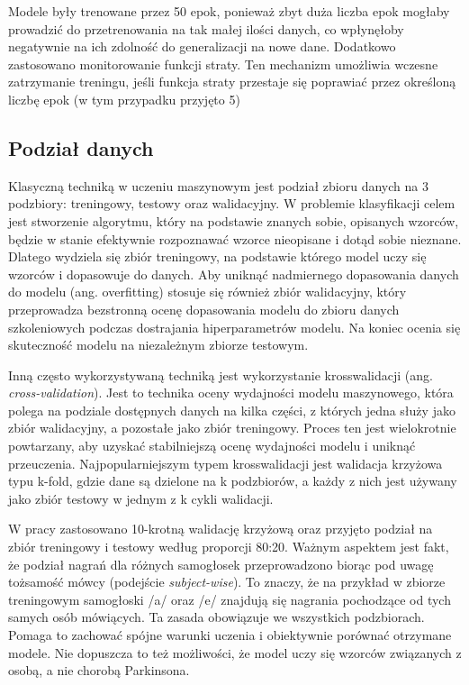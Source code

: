 Modele były trenowane przez 50 epok, ponieważ zbyt duża liczba epok mogłaby prowadzić do przetrenowania na tak małej ilości danych, co wpłynęłoby negatywnie na ich zdolność do generalizacji na nowe dane.
Dodatkowo zastosowano monitorowanie funkcji straty.
Ten mechanizm umożliwia wczesne zatrzymanie treningu, jeśli funkcja straty przestaje się poprawiać przez określoną liczbę epok (w tym przypadku przyjęto 5)

\subsection{Podział danych}
\label{subsec:podzial-danych}

Klasyczną techniką w uczeniu maszynowym jest podział zbioru danych na 3 podzbiory: treningowy, testowy oraz walidacyjny.
W problemie klasyfikacji celem jest stworzenie algorytmu, który na podstawie znanych sobie, opisanych wzorców, będzie w stanie efektywnie rozpoznawać wzorce nieopisane i dotąd sobie nieznane.
Dlatego wydziela się zbiór treningowy, na podstawie którego model uczy się wzorców i dopasowuje do danych.
Aby uniknąć nadmiernego dopasowania danych do modelu (ang.
overfitting) stosuje się również zbiór walidacyjny, który  przeprowadza bezstronną ocenę dopasowania modelu do zbioru danych szkoleniowych podczas dostrajania hiperparametrów modelu.
Na koniec ocenia się skuteczność modelu na niezależnym zbiorze testowym.

Inną często wykorzystywaną techniką jest wykorzystanie krosswalidacji (ang. \emph{cross-validation}).
Jest to technika oceny wydajności modelu maszynowego, która polega na podziale dostępnych danych na kilka części, z których jedna służy jako zbiór walidacyjny, a pozostałe jako zbiór treningowy.
Proces ten jest wielokrotnie powtarzany, aby uzyskać stabilniejszą ocenę wydajności modelu i uniknąć przeuczenia.
Najpopularniejszym typem krosswalidacji jest walidacja krzyżowa typu k-fold, gdzie dane są dzielone na k podzbiorów, a każdy z nich jest używany jako zbiór testowy w jednym z k cykli walidacji.

W pracy zastosowano 10-krotną walidację krzyżową oraz przyjęto podział na zbiór treningowy i testowy według proporcji 80:20.
Ważnym aspektem jest fakt, że podział nagrań dla różnych samogłosek przeprowadzono biorąc pod uwagę tożsamość mówcy (podejście \emph{subject-wise}).
To znaczy, że na przykład w zbiorze treningowym samogłoski /a/ oraz /e/ znajdują się nagrania pochodzące od tych samych osób mówiących.
Ta zasada obowiązuje we wszystkich podzbiorach.
Pomaga to zachować spójne warunki uczenia i obiektywnie porównać otrzymane modele.
Nie dopuszcza to też możliwości, że model uczy się wzorców związanych z osobą, a nie chorobą Parkinsona.

